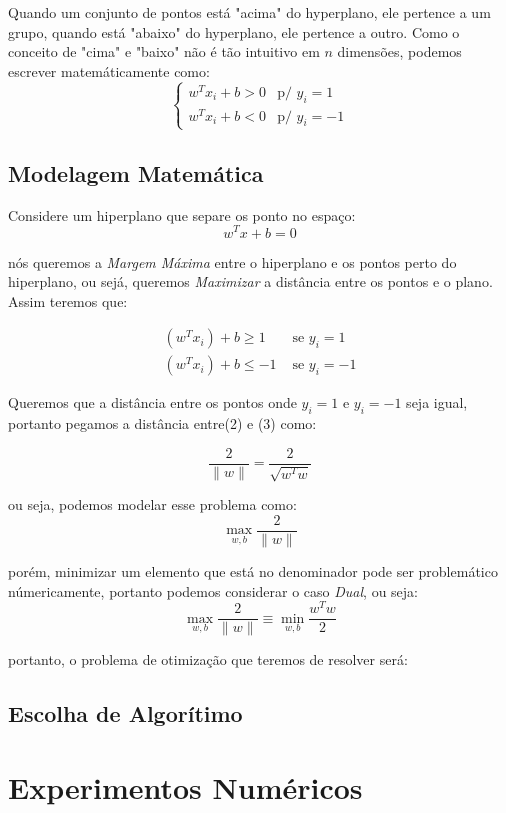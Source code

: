 \documentclass{article}
\begin{document}
Quando um conjunto de pontos está "acima" do hyperplano, ele pertence a um grupo, quando está "abaixo" do hyperplano, ele pertence a outro. 
Como o conceito de "cima" e "baixo" não é tão intuitivo em \(n\) dimensões, podemos escrever matemáticamente como:
\begin{equation}
    \begin{cases}
        w^Tx_i+b>0 &\text{p/ } y_i=1 \\w^Tx_i+b<0 &\text{p/ } y_i=-1
    \end{cases}
\end{equation}


\subsection{Modelagem Matemática}

 Considere um hiperplano que separe os ponto no espaço:
\[w^Tx+b=0\]

nós queremos a \textit{Margem Máxima} entre o hiperplano e os pontos perto do hiperplano, ou sejá, queremos \textit{Maximizar} a distância entre os pontos e o plano. Assim teremos que:

\begin{align}
    (w^Tx_i)+b\geq 1 &\text{ se } y_i=1 \\
    (w^Tx_i)+b\leq -1 &\text{ se } y_i=-1
\end{align}

Queremos que a distância entre os pontos onde \(y_i=1\) e \(y_i=-1\) seja igual, portanto pegamos a distância entre(2) e (3) como:

\[\frac{2}{\|w\|}= \frac{2}{\sqrt{w^Tw}}\]

ou seja, podemos modelar esse problema como:
\[\max_{w,b}\frac{2}{\|w\|}\]

porém, minimizar um elemento que está no denominador pode ser problemático númericamente, portanto podemos considerar o caso \textit{Dual}, ou seja:
\[\max_{w,b}\frac{2}{\|w\|}\equiv \min_{w,b}\frac{w^Tw}{2}\]

portanto, o problema de otimização que teremos de resolver será:


\subsection{Escolha de Algorítimo}

\section{Experimentos Numéricos}
\end{document}
